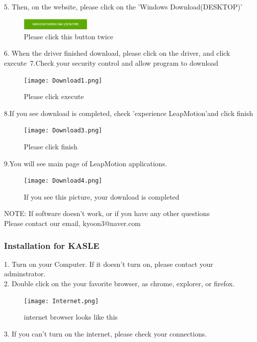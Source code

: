 \documentclass[10pt,journal,compsoc]{IEEEtran}
\begin{document}
5. Then, on the website, please click on the 'Windows Download(DESKTOP)'\\
\begin{figure}[H]
\centering
\includegraphics[width=0.3\textwidth]{Download.png}
{\caption*{Please click  this button twice }}
\end{figure}

6. When the driver finished download, please click on the driver, and click execute\
7.Check your security control and allow program to download
\begin{figure}[H]
\centering
\texttt{[image: Download1.png]}
{\caption*{Please click execute}}
\end{figure}

8.If you see download is completed, check 'experience LeapMotion'and click finish \\
\begin{figure}[H]
\centering
\texttt{[image: Download3.png]}
{\caption*{Please click finish}}
\end{figure}

9.You will see main page of LeapMotion applications.
\begin{figure}[H]
\centering
\texttt{[image: Download4.png]}
{\caption*{If you see this picture, your download is completed }}
\end{figure}

NOTE: If software doesn't work, or if you have any other questions \\
Please contact our email, kyoon3@naver.com\\
\subsubsection{Installation for KASLE}
1. Turn on your Computer. If it doesn't turn on, please contact your adminstrator.\\
2. Double click on the your favorite browser, as chrome, explorer, or firefox.\\ 

\begin{figure}[H]
\centering
\texttt{[image: Internet.png]}
{\caption*{internet browser looks like this}}
\end{figure}

3. If you can't turn on the internet, please check your connections.\\ 
\end{document}
